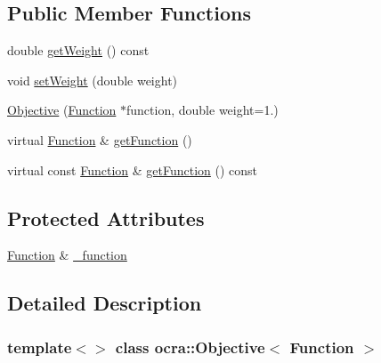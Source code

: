 \subsection*{Public Member Functions}
\begin{DoxyCompactItemize}
\item 
double \hyperlink{classocra_1_1Objective_3_01Function_01_4_ac952056842fb2d15b758eb5a0b342a30}{get\+Weight} () const
\item 
void \hyperlink{classocra_1_1Objective_3_01Function_01_4_a41fa85e1e535bb935f20312e7b398a26}{set\+Weight} (double weight)
\end{DoxyCompactItemize}
{\bf }\par
\begin{DoxyCompactItemize}
\item 
\hyperlink{classocra_1_1Objective_3_01Function_01_4_a5a469564d2691823b5e9e951c975b66c}{Objective} (\hyperlink{classocra_1_1Function}{Function} $\ast$function, double weight=1.)
\end{DoxyCompactItemize}

{\bf }\par
\begin{DoxyCompactItemize}
\item 
virtual \hyperlink{classocra_1_1Function}{Function} \& \hyperlink{classocra_1_1Objective_3_01Function_01_4_add81891f4afd477c85ddc326a207e8be}{get\+Function} ()
\item 
virtual const \hyperlink{classocra_1_1Function}{Function} \& \hyperlink{classocra_1_1Objective_3_01Function_01_4_a95077951a77304a73e345eb093513da0}{get\+Function} () const
\end{DoxyCompactItemize}

\subsection*{Protected Attributes}
\begin{DoxyCompactItemize}
\item 
\hyperlink{classocra_1_1Function}{Function} \& \hyperlink{classocra_1_1Objective_3_01Function_01_4_a68d84f4b46839664695f62c12ed8092d}{\+\_\+function}
\end{DoxyCompactItemize}


\subsection{Detailed Description}
\subsubsection*{template$<$$>$\newline
class ocra\+::\+Objective$<$ Function $>$}



